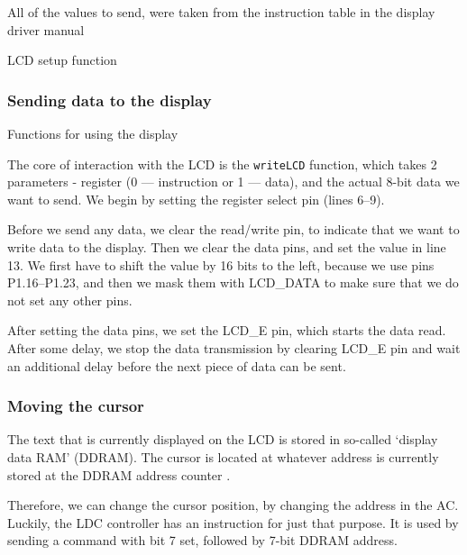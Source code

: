 \documentclass[10pt]{article}
\newcommand{\code}[3]{}
\begin{document}
    All of the values to send, were taken from the instruction table in the display driver manual \cite[p.24]{display-man}

    \begin{program}[H]
        \code{63}{96}{display.h}
        \caption{LCD setup function}
    \end{program}

    \subsubsection{Sending data to the display}

    \begin{program}[H]
        \code{16}{52}{display.h}
        \caption{Functions for using the display}
        \label{lst:display-util-functions}
    \end{program}

    The core of interaction with the LCD is the \texttt{writeLCD} function, which takes 2 parameters - register (0 --- instruction or 1 --- data),
    and the actual 8-bit data we want to send. 
    We begin by setting the register select pin (lines 6--9).

    Before we send any data, we clear the read/write pin, to indicate that we want to write data to the display.
    Then we clear the data pins, and set the value in line 13.
    We first have to shift the value by 16 bits to the left, because we use pins P1.16--P1.23, and then we mask them with LCD\_DATA to make sure that we do not set any other pins.

    \pagebreak
    After setting the data pins, we set the LCD\_E pin, which starts the data read. 
    After some delay, we stop the data transmission by clearing LCD\_E pin and wait an additional delay before the next piece of data can be sent.

    \subsubsection{Moving the cursor}
    The text that is currently displayed on the LCD is stored in so-called `display data RAM' (DDRAM). 
    The cursor is located at whatever address is currently stored at the DDRAM address counter \cite[p.21]{display-man}.

    Therefore, we can change the cursor position, by changing the address in the AC.
    Luckily, the LDC controller has an instruction for just that purpose.
    It is used by sending a command with bit 7 set, followed by 7-bit DDRAM address.
\end{document}

